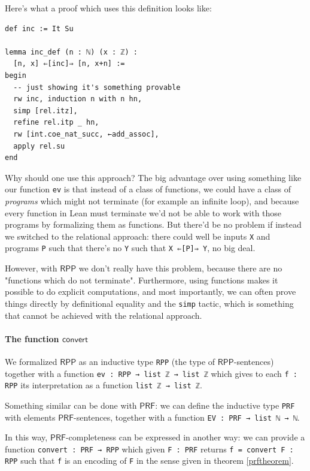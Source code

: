 \documentclass{book}
\theoremstyle{definition}
\theoremstyle{remark}
\theoremstyle{plain}
\newcommand{\RPP}{\mathsf{RPP}}
\newcommand{\rppconvert}{\mathsf{convert}}
\newcommand{\PRF}{\mathsf{PRF}}
\begin{document}
Here's what a proof which uses this definition looks like:
\begin{lstlisting}
def inc := It Su

lemma inc_def (n : ℕ) (x : ℤ) :
  [n, x] ⇐[inc]⇒ [n, x+n] :=
begin
  -- just showing it's something provable
  rw inc, induction n with n hn,
  simp [rel.itz],
  refine rel.itp _ hn,
  rw [int.coe_nat_succ, ←add_assoc],
  apply rel.su
end
\end{lstlisting}

Why should one use this approach?
The big advantage over using something like our function \lstinline{ev} is that
instead of a class of functions, we could have a class of \textit{programs} which might not terminate (for example an infinite loop),
and because every function in Lean must terminate we'd not be able to work with those programs by formalizing them as functions.
But there'd be no problem if instead we switched to the relational approach:
there could well be inputs \lstinline{X} and programs \lstinline{P} such that there's no \lstinline{Y}
such that \lstinline{X ⇐[P]⇒ Y}, no big deal.

However, with $\RPP$ we don't really have this problem, because there are no "functions which do not terminate".
Furthermore, using functions makes it possible to do explicit computations, and most importantly,
we can often prove things directly by definitional equality and the \lstinline{simp} tactic,
which is something that cannot be achieved with the relational approach.

\paragraph{The function $\rppconvert$}

We formalized $\RPP$ as an inductive type \lstinline{RPP} (the type of $\RPP$-sentences)
together with a function \lstinline{ev : RPP → list ℤ → list ℤ}
which gives to each \lstinline{f : RPP} its interpretation as a function \lstinline{list ℤ → list ℤ}.

Something similar can be done with $\PRF$: we can define the inductive type \lstinline{PRF}
with elements $\PRF$-sentences, together with a function \lstinline{EV : PRF → list ℕ → ℕ}.

In this way, $\PRF$-completeness can be expressed in another way:
we can provide a function \lstinline{convert : PRF → RPP} which given \lstinline{F : PRF}
returns \lstinline{f = convert F : RPP} such that \lstinline{f} is an encoding of \lstinline{F} in the sense
given in theorem \ref{prftheorem}.
\end{document}

